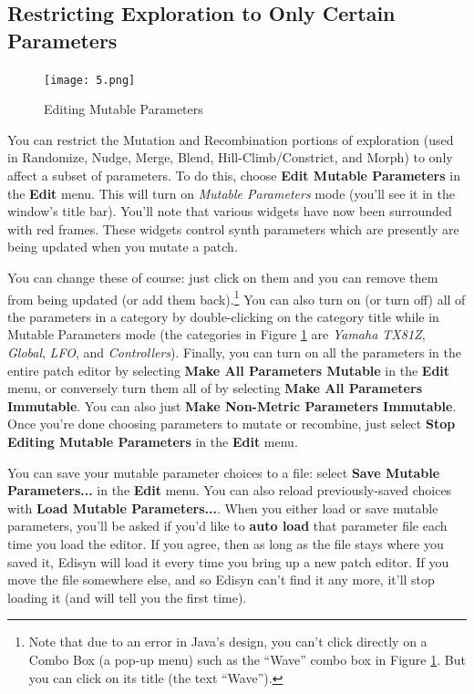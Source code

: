 \documentclass{article}
\begin{document}
\subsection{Restricting Exploration to Only Certain Parameters}
\label{restriction} 

\begin{figure}
\vspace{-2em}\texttt{[image: 5.png]}
\vspace{-2em}\caption{Editing Mutable Parameters}\label{mutationparameters}
\end{figure}

You can restrict the Mutation and Recombination portions of exploration (used in Randomize, Nudge, Merge, Blend, Hill-Climb/Constrict, and Morph) to only affect a subset of parameters.  To do this, choose {\bf Edit Mutable Parameters} in the {\bf Edit} menu.  This will turn on {\it Mutable Parameters} mode (you'll see it in the window's title bar).  You'll note that various widgets have now been surrounded with red frames.  These widgets control synth parameters which are presently are being updated when you mutate a patch. 

You can change these of course: just click on them and you can remove them from being updated (or add them back).\footnote{Note that due to an error in Java's design, you can't click directly on a Combo Box (a pop-up menu) such as the ``Wave'' combo box in Figure \ref{mutationparameters}.  But you can click on its title (the text ``Wave'').}  You can also turn on (or turn off) all of the parameters in a category by double-clicking on the category title while in Mutable Parameters mode (the categories in Figure \ref{mutationparameters} are {\it Yamaha TX81Z}, {\it Global}, {\it LFO}, and {\it Controllers}).  Finally, you can turn on all the parameters in the entire patch editor by selecting {\bf Make All Parameters Mutable} in the {\bf Edit} menu, or conversely turn them all of by selecting {\bf Make All Parameters Immutable}.  You can also just {\bf Make Non-Metric Parameters Immutable}.   Once you're done choosing parameters to mutate or recombine, just select {\bf Stop Editing Mutable Parameters} in the {\bf Edit} menu.

You can save your mutable parameter choices to a file: select {\bf Save Mutable Parameters...} in the {\bf Edit} menu.  You can also reload previously-saved choices with {\bf Load Mutable Parameters...}.  When you either load or save mutable parameters, you'll be asked if you'd like to {\bf auto load} that parameter file each time you load the editor.  If you agree, then as long as the file stays where you saved it, Edisyn will load it every time you bring up a new patch editor.  If you move the file somewhere else, and so Edisyn can't find it any more, it'll stop loading it (and will tell you the first time).
\end{document}
